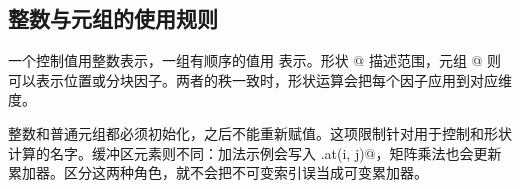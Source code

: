 \subsection*{整数与元组的使用规则}

一个控制值用整数表示，一组有顺序的值用 \co@ituple@ 表示。形状 \co@[7, 14]@ 描述范围，元组 @ 则可以表示位置或分块因子。两者的秩一致时，形状运算会把每个因子应用到对应维度。

整数和普通元组都必须初始化，之后不能重新赋值。这项限制针对用于控制和形状计算的名字。缓冲区元素则不同：加法示例会写入 \co@output.at(i, j)@，矩阵乘法也会更新累加器。区分这两种角色，就不会把不可变索引误当成可变累加器。
